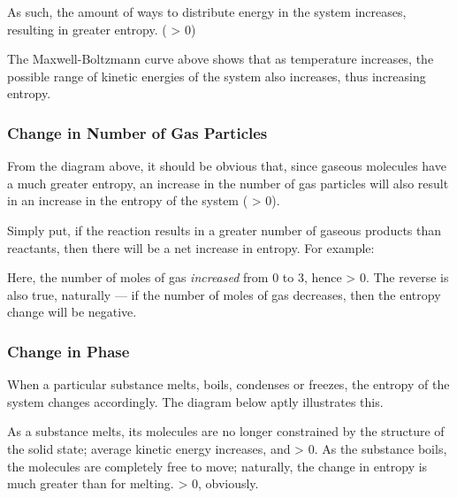 			As such, the amount of ways to distribute energy in the system increases, resulting in greater entropy. (\entr{} > 0)


			The Maxwell-Boltzmann curve above shows that as temperature increases, the possible range of kinetic energies of the system
			also increases, thus increasing entropy.


		\subsubsection{Change in Number of Gas Particles}

			From the diagram above, it should be obvious that, since gaseous molecules have a much greater entropy, an increase in the number
			of gas particles will also result in an increase in the entropy of the system (\entr{} > 0).

			Simply put, if the reaction results in a greater number of gaseous products than reactants, then there will be a net
			increase in entropy. For example:


			Here, the number of moles of gas \emph{increased} from 0 to 3, hence \entr{} > 0. The reverse is also true, naturally --- if the
			number of moles of gas decreases, then the entropy change will be negative.


		\subsubsection{Change in Phase}

			When a particular substance melts, boils, condenses or freezes, the entropy of the system changes accordingly.
			The diagram below aptly illustrates this.


			As a substance melts, its molecules are no longer constrained by the structure of the solid state; average kinetic energy increases,
			and \entr{} > 0. As the substance boils, the molecules are completely free to move; naturally, the change in entropy is much greater
			than for melting. \entr{} > 0, obviously.

